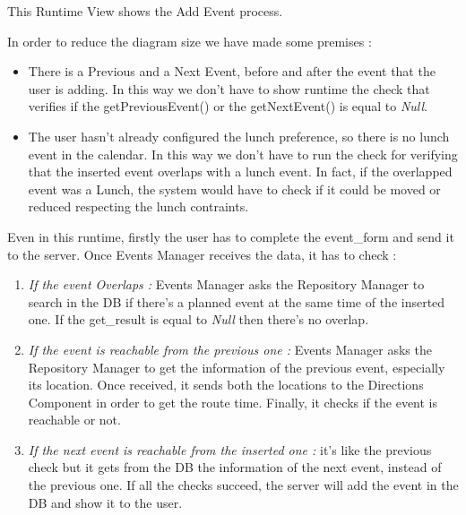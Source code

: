 \newpage
{}
This Runtime View shows the Add Event process.\par
In order to reduce the diagram size we have made some premises :
\begin{itemize}
	\setlength{\leftskip}{1cm}
	\item There is a Previous and a Next Event, before and after the event that the user is adding. In this way we don’t have to show runtime the check that verifies if the getPreviousEvent() or the getNextEvent() is equal to \emph{Null}.
	\item The user hasn’t already configured the lunch preference, so there is no lunch event in the calendar. In this way we don’t have to run the check for verifying that the inserted event overlaps with a lunch event. In fact, if the overlapped event was a Lunch, the system would have to check if it could be moved or reduced respecting the lunch contraints.
\end{itemize}\par
Even in this runtime, firstly the user has to complete the event\_form and send it to the server.
Once Events Manager receives the data, it has to check :
\begin{enumerate}
	\setlength{\leftskip}{1cm}
	\item \emph{If the event Overlaps :} Events Manager asks the Repository Manager to search in the DB if there’s a planned event at the same time of the inserted one. If the get\_result is equal to \emph{Null} then there’s no overlap.
	\item \emph{If the event is reachable from the previous one :} Events Manager asks the Repository Manager to get the information of the previous event, especially its location. Once received, it sends both the locations to the Directions Component in order to get the route time. Finally, it checks if the event is reachable or not.
	\item \emph{If the next event is reachable from the inserted one :} it’s like the previous check but it gets from the DB the information of the next event, instead of the previous one.
	If all the checks succeed, the server will add the event in the DB and show it to the user.
\end{enumerate}
